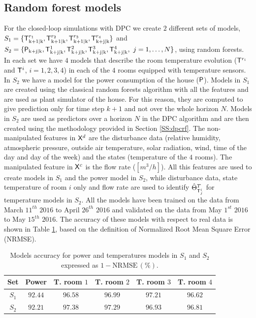 \subsection{Random forest models}
\label{SS:randomForestsModels}
For the closed-loop simulations with DPC we create $2$ different sets of models, $S_1 = \{\mathsf{T}^{r_1}_{\mathrm{k+1|k}},\mathsf{T}^{r_2}_{\mathrm{k+1|k}},\mathsf{T}^{r_3}_{\mathrm{k+1|k}},\mathsf{T}^{r_4}_{\mathrm{k+j|k}}\}$ and $S_2 = \{\tP_{\mathrm{k+j|k}},\tT^{1}_{\mathrm{k+j|k}},\tT^{2}_{\mathrm{k+j|k}},\tT^{3}_{\mathrm{k+j|k}},\\\tT^{4}_{\mathrm{k+j|k}},\ j = 1,\ldots,N\}$, using random forests. In each set we have  $4$ models that describe the room temperature evolution ($\mathsf{T}^{r_i}$ and $\mathsf{T}^i$, $i=1,2,3,4$) in each of the $4$ rooms equipped with temperature sensors. In $S_2$ we have a model for the power consumption of the house ($\mathsf{P}$). Models in $S_1$ are created using the classical random forests algorithm with all the features and are used as plant simulator of the house. For this reason, they are computed to give prediction only for time step $k+1$ and not over the whole horizon $N$. Models in $S_2$ are used as predictors over a horizon $N$ in the DPC algorithm and are then created using the methodology provided in Section \ref{SS:dpcrf}. The non-manipulated features in $\mathsf{X}^d$ are the disturbance data (relative humidity, atmospheric pressure, outside air temperature, solar radiation, wind, time of the day and day of the week) and the states (temperature of the $4$ rooms). The manipulated feature in $\mathsf{X}^c$ is the flow rate ($[m^3/h]$). All this features are used to create models in $S_1$ and the power model in $S_2$, while disturbance data, state temperature of room $i$ only and flow rate are used to identify $\hat{\Theta}^{T}_{\mathsf{T}^i_j}$ for temperature models in $S_2$. All the models have been trained on the data from March $11^{th}$ $2016$ to April $26^{th}$ $2016$ and validated on the data from May $1^{st}$ $2016$ to May $15^{th}$ $2016$. The accuracy of these models with respect to real data is shown in Table \ref{T:S1accuracy}, based on the definition of Normalized Root Mean Square Error (NRMSE).

\begin{table}[h!]
	\centering
	\begin{tabular}{cccccc}
		\toprule
		Set       & Power   & T. room $1$ & T. room $2$ & T. room $3$ & T. room $4$  \\ 
		\midrule
		$S_1$     & $92.44$ & $96.58$     & $96.99$     & $97.21$     & $96.62$\\
		$S_2$     & $92.21$ & $97.38$     & $97.29$     & $96.93$     & $96.81$\\
		\bottomrule
	\end{tabular}
	\caption{Models accuracy for power and temperatures models in $S_1$ and $S_2$ expressed as $\mathrm{1-NRMSE}\,(\%)$.}
	\captionsetup{justification=centering}
	\label{T:S1accuracy}
\end{table}

